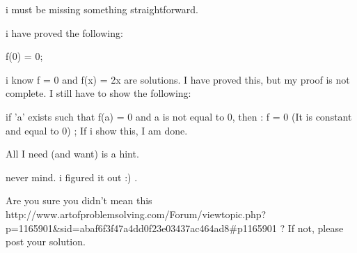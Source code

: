 \begin{solution}
	i must be missing something straightforward. 

i have proved the following:

f(0) = 0;

i know f = 0 and f(x) = 2x are solutions. I have proved this, but my proof is not complete. I still have to show the following:

if 'a' exists such that f(a) = 0 and a is not equal to 0, then :  f = 0 (It is constant and equal to 0) ; If i show this, I am done. 

All I need (and want) is a hint.
\end{solution}



\begin{solution}
	never mind. i figured it out :) .
\end{solution}



\begin{solution}
	Are you sure you didn't mean this http://www.artofproblemsolving.com/Forum/viewtopic.php?p=1165901&sid=abaf6f3f47a4dd0f23e03437ac464ad8#p1165901 ? If not, please post your solution.
\end{solution}



